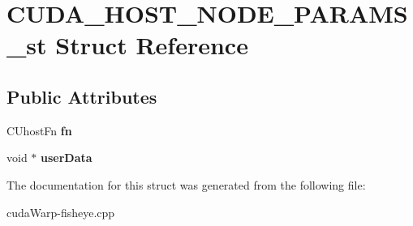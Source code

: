 \hypertarget{structCUDA__HOST__NODE__PARAMS__st}{}\section{C\+U\+D\+A\+\_\+\+H\+O\+S\+T\+\_\+\+N\+O\+D\+E\+\_\+\+P\+A\+R\+A\+M\+S\+\_\+st Struct Reference}
\label{structCUDA__HOST__NODE__PARAMS__st}
\subsection*{Public Attributes}
\begin{DoxyCompactItemize}
\item 
C\+Uhost\+Fn {\bfseries fn}\hypertarget{structCUDA__HOST__NODE__PARAMS__st_a25d2969cf4d2c8b283289f3b628f0b13}{}\label{structCUDA__HOST__NODE__PARAMS__st_a25d2969cf4d2c8b283289f3b628f0b13}

\item 
void $\ast$ {\bfseries user\+Data}\hypertarget{structCUDA__HOST__NODE__PARAMS__st_a9055c29d12ff14badb9e858a895f1716}{}\label{structCUDA__HOST__NODE__PARAMS__st_a9055c29d12ff14badb9e858a895f1716}

\end{DoxyCompactItemize}


The documentation for this struct was generated from the following file\+:\begin{DoxyCompactItemize}
\item 
cuda\+Warp-\/fisheye.\+cpp\end{DoxyCompactItemize}
